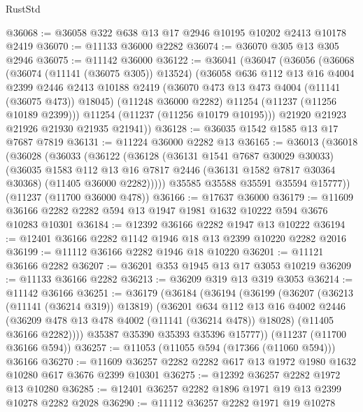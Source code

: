 \begin{lexlean}{RustStd}
\begin{coremodule}
@36068 := @36058 @322 @638 @13 @17 @2946 @10195 @10202 @2413 @10178 @2419
@36070 := @11133 @36000 @2282
@36074 := @36070 @305 @13 @305 @2946
@36075 := @11142 @36000
@36122 := @36041
    (@36047
      (@36056
        (@36068
          (@36074 (@11141 (@36075 @305)) @13524)
          (@36058
            @636
            @112
            @13
            @16
            @4004
            @2399
            @2446
            @2413
            @10188
            @2419
            (@36070 @473 @13 @473 @4004 (@11141 (@36075 @473)) @18045)
            (@11248 @36000 @2282)
            @11254
            (@11237 (@11256 @10189 @2399)))
          @11254
          (@11237 (@11256 @10179 @10195)))
        @21920
        @21923
        @21926
        @21930
        @21935
        @21941))
@36128 := @36035 @1542 @1585 @13 @17 @7687 @7819
@36131 := @11224 @36000 @2282 @13
@36165 := @36013
    (@36018
      (@36028
        (@36033
          (@36122
            (@36128
              (@36131 @1541 @7687 @30029 @30033)
              (@36035
                @1583
                @112
                @13
                @16
                @7817
                @2446
                (@36131 @1582 @7817 @30364 @30368)
                (@11405 @36000 @2282)))))
        @35585
        @35588
        @35591
        @35594
        @15777))
    (@11237 (@11700 @36000 @478))
@36166 := @17637 @36000
@36179 := @11609 @36166 @2282 @2282 @594 @13 @1947 @1981 @1632 @10222 @594 @3676 @10283 @10301
@36184 := @12392 @36166 @2282 @1947 @13 @10222
@36194 := @12401 @36166 @2282 @1142 @1946 @18 @13 @2399 @10220 @2282 @2016
@36199 := @11112 @36166 @2282 @1946 @18 @10220
@36201 := @11121 @36166 @2282
@36207 := @36201 @353 @1945 @13 @17 @3053 @10219
@36209 := @11133 @36166 @2282
@36213 := @36209 @319 @13 @319 @3053
@36214 := @11142 @36166
@36251 := @36179
    (@36184
      (@36194
        (@36199
          (@36207
            (@36213 (@11141 (@36214 @319)) @13819)
            (@36201
              @634
              @112
              @13
              @16
              @4002
              @2446
              (@36209 @478 @13 @478 @4002 (@11141 (@36214 @478)) @18028)
              (@11405 @36166 @2282))))
        @35387
        @35390
        @35393
        @35396
        @15777))
    (@11237 (@11700 @36166 @594))
@36257 := @11053 (@11055 @594 (@17366 (@11060 @594))) @36166
@36270 := @11609 @36257 @2282 @2282 @617 @13 @1972 @1980 @1632 @10280 @617 @3676 @2399 @10301
@36275 := @12392 @36257 @2282 @1972 @13 @10280
@36285 := @12401 @36257 @2282 @1896 @1971 @19 @13 @2399 @10278 @2282 @2028
@36290 := @11112 @36257 @2282 @1971 @19 @10278

\end{coremodule}
\end{lexlean}
